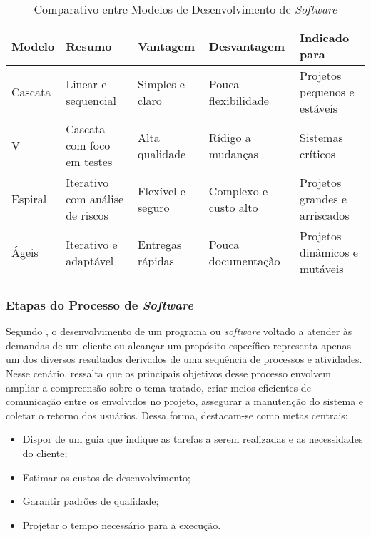 \documentclass[english,brazilian]{UNISINOSartigo} %
\begin{document}
\begin{table}[ht]
    \caption{Comparativo entre Modelos de Desenvolvimento de \textit{Software}}
    \label{tab:modelosDev}
    \centering%
    \footnotesize
    \begin{tabularx}{\textwidth}{lXXXX}
        \toprule
        \textbf{Modelo} & \textbf{Resumo} & \textbf{Vantagem} & \textbf{Desvantagem} & \textbf{Indicado para}\\
        \midrule
        Cascata & Linear e sequencial & Simples e claro & Pouca flexibilidade & Projetos pequenos e estáveis \\
        \midrule
        V & Cascata com foco em testes & Alta qualidade & Rídigo a mudanças & Sistemas críticos \\
        \midrule
        Espiral & Iterativo com análise de riscos & Flexível e seguro & Complexo e custo alto & Projetos grandes e arriscados \\
        \midrule
        Ágeis & Iterativo e adaptável & Entregas rápidas & Pouca documentação & Projetos dinâmicos e mutáveis \\
        \bottomrule
    \end{tabularx}
\end{table}
\FloatBarrier

\subsubsection{Etapas do Processo de \textit{Software}}

Segundo , o desenvolvimento de um programa ou \textit{software} voltado a atender às demandas de um cliente ou alcançar um propósito específico representa apenas um dos diversos resultados derivados de uma sequência de processos e atividades. Nesse cenário,  ressalta que os principais objetivos desse processo envolvem ampliar a compreensão sobre o tema tratado, criar meios eficientes de comunicação entre os envolvidos no projeto, assegurar a manutenção do sistema e coletar o retorno dos usuários. Dessa forma, destacam-se como metas centrais:

\begin{itemize}[leftmargin=1cm, itemsep=0.1em, topsep=0.1em]
    \item Dispor de um guia que indique as tarefas a serem realizadas e as necessidades do cliente;
    \item Estimar os custos de desenvolvimento;
    \item Garantir padrões de qualidade;
    \item Projetar o tempo necessário para a execução.
\end{itemize}
\end{document}
